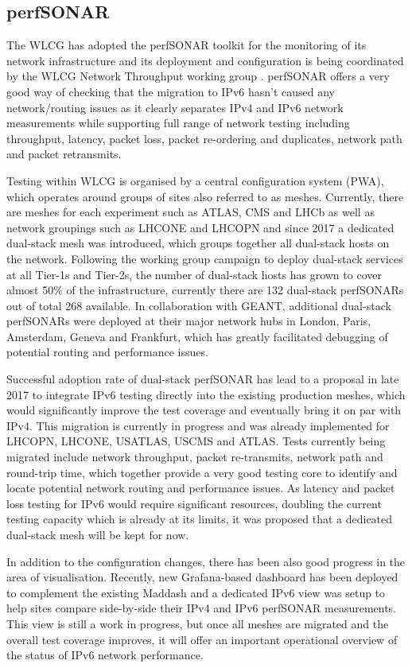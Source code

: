 \subsection{perfSONAR}
The WLCG has adopted the perfSONAR toolkit \cite{perfsonar} for the monitoring of its network infrastructure and its deployment and configuration is being coordinated by the WLCG Network Throughput working group \cite{wlcg-NTWG}.  perfSONAR offers a very good way of checking that the migration to IPv6 hasn't caused any network/routing issues as it clearly separates IPv4 and IPv6 network measurements while supporting full range of network testing including throughput, latency, packet loss, packet re-ordering and duplicates, network path and packet retransmits.

Testing within WLCG is organised by a central configuration system (PWA), which operates around groups of sites also referred to as meshes. Currently, there are meshes for each  experiment such as ATLAS, CMS and LHCb as well as network groupings such as LHCONE and LHCOPN and since 2017 a dedicated dual-stack mesh was introduced, which groups together all dual-stack hosts on the network. Following the working group campaign to deploy dual-stack services at all Tier-1s and Tier-2s, the number of dual-stack hosts has grown to cover almost 50\% of the infrastructure, currently there are 132 dual-stack perfSONARs out of total 268 available. In collaboration with GEANT, additional dual-stack perfSONARs were deployed at their major network hubs in London, Paris, Amsterdam, Geneva and Frankfurt, which has greatly facilitated debugging of potential routing and performance issues. 

Successful adoption rate of dual-stack perfSONAR has lead to a proposal in late 2017 to integrate IPv6 testing directly into the existing production meshes, which would significantly improve the test coverage and eventually bring it on par with IPv4. This migration is currently in progress and was already implemented for LHCOPN, LHCONE, USATLAS, USCMS and ATLAS. Tests currently being migrated include network throughput, packet re-transmits, network path and round-trip time, which together provide a very good testing core to identify and locate potential network routing and performance issues. As latency and packet loss testing for IPv6 would require significant resources, doubling the current testing capacity which is already at its limits, it was proposed that a dedicated dual-stack mesh will be kept for now. 

In addition to the configuration changes, there has been also good progress in the area of visualisation. Recently, new Grafana-based dashboard has been deployed to complement the existing Maddash \cite{psmad} and a dedicated IPv6 view was setup \cite{grafana-ipv6} to help sites compare side-by-side their IPv4 and IPv6 perfSONAR measurements. This view is still a work in progress, but once all meshes are migrated and the overall test coverage improves, it will offer an important operational overview of the status of IPv6 network performance. 


